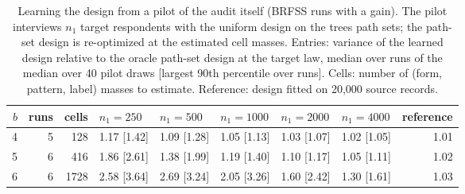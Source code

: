 \begin{table}[h]
\centering
\caption{Learning the design from a pilot of the audit itself (BRFSS runs with a gain). The pilot interviews $n_1$ target respondents with the uniform design on the tree\textquotesingle s path sets; the path-set design is re-optimized at the estimated cell masses. Entries: variance of the learned design relative to the oracle path-set design at the target law, median over runs of the median over 40 pilot draws [largest 90th percentile over runs]. Cells: number of (form, pattern, label) masses to estimate. Reference: design fitted on 20,000 source records.}
\label{tab:pilot}
\small
\begin{tabular}{rrrlllllr}
\toprule
$b$ & runs & cells & $n_1=250$ & $n_1=500$ & $n_1=1000$ & $n_1=2000$ & $n_1=4000$ & reference \\
\midrule
4 & 5 & 128 & 1.17 [1.42] & 1.09 [1.28] & 1.05 [1.13] & 1.03 [1.07] & 1.02 [1.05] & 1.01 \\
5 & 6 & 416 & 1.86 [2.61] & 1.38 [1.99] & 1.19 [1.40] & 1.10 [1.17] & 1.05 [1.11] & 1.02 \\
6 & 6 & 1728 & 2.58 [3.64] & 2.69 [3.24] & 2.05 [3.26] & 1.60 [2.42] & 1.30 [1.61] & 1.03 \\
\bottomrule
\end{tabular}
\end{table}
